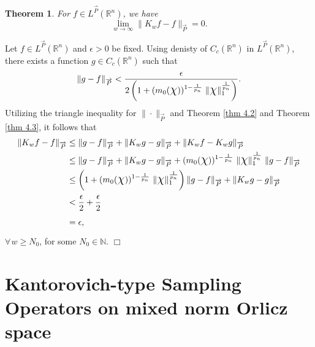 \documentclass[11pt, a4paper]{article}
\newtheorem{thm}{Theorem}[section]
\theoremstyle{definition}
\newcommand{\qedwhite}{\hfill \ensuremath{\Box}}
\renewenvironment{proof}{{\raggedright \bfseries Proof.}}{\qedwhite}
\numberwithin{equation}{section}
\def\NN{\mathbb N}
\def\RR{\mathbb R}
\def\Chi{\mbox{\Large$\chi$}}
\begin{document}
\begin{thm}
    For $f\in L^{\overrightarrow P}(\RR^{n})$, we have $$ \lim_{w\to\infty}\|K_{w}f-f\|_{\overrightarrow{P}}=0. $$
\end{thm}
\begin{proof}
 Let $f\in L^{\overrightarrow{P}}(\RR^{n})$ and $\epsilon >0$ be fixed. Using denisty of $C_{c}(\mathbb{R}^n)$ in $L^{\overrightarrow P}(\RR^n)$, 
 there exists a function $g \in C_{c}(\RR^{n})$ such that 
	$$\|g-f\|_{\overrightarrow{P}}< \frac{\epsilon}{2\left(1+(m_{0}(\Chi))^{1-\frac{1}{p_n}}\hspace{3pt}\|\Chi\|_{1}^{\frac{1}{p_n}}\right)}.$$
	Utilizing the triangle inequality for $\|\cdot\|_{\overrightarrow{P}}$ and Theorem \ref{thm 4.2} and Theorem \ref{thm 4.3}, it follows that
	\begin{equation*}
		\begin{split}
			\|K_{w}f-f\|_{\overrightarrow{P}} &\leq \|g-f\|_{\overrightarrow{P}}+\|K_{w}g-g\|_{\overrightarrow{P}}+\|K_{w}f-K_{w}g\|_{\overrightarrow{P}}\\
			&\leq \|g-f\|_{\overrightarrow{P}}+\|K_{w}g-g\|_{\overrightarrow{P}}+(m_{0}(\Chi))^{1-\frac{1}{p_n}}\hspace{3pt}\|\Chi\|_{1}^{\frac{1}{p_n}}\hspace{3pt}\|g-f \|_{\overrightarrow{P}} \\
			& \leq\left(1+(m_{0}(\Chi))^{1-\frac{1}{p_n}}\hspace{3pt}\|\Chi\|_{1}^{\frac{1}{p_n}}\right)\|g-f \|_{\overrightarrow{P}} + \|K_{w}g-g\|_{\overrightarrow{P}}\\
			& <{\frac{\epsilon}{2}} + {\frac{\epsilon}{2}}\\
			&=\epsilon,
		\end{split}
	\end{equation*}
	$\forall \hspace{1pt} w \geq N_{0}$, for some $N_{0} \in \NN.$
\end{proof}


\section{Kantorovich-type Sampling Operators on mixed norm Orlicz space}
\label{5}
\end{document}
